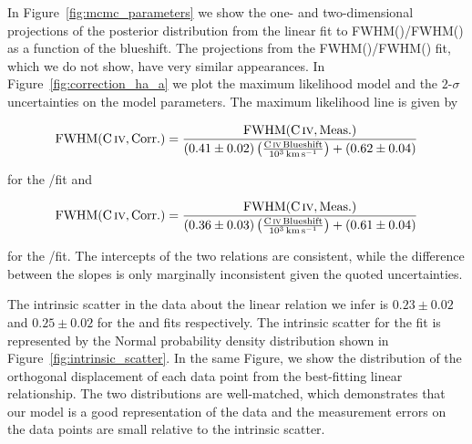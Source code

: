 In Figure~\ref{fig:mcmc_parameters} we show the one- and two-dimensional projections of the posterior distribution from the linear fit to FWHM()/FWHM(\hans) as a function of the  blueshift. 
The projections from the FWHM()/FWHM(\hbns) fit, which we do not show, have very similar appearances.
In Figure~\ref{fig:correction_ha_a} we plot the maximum likelihood model and the $2$-$\sigma$ uncertainties on the model parameters. 
The maximum likelihood line is given by  

\begingroup\makeatletter{}\check@mathfonts
\begin{eqnarray}
    \label{eq:hafwhm}
    \text{FWHM}(\text{C}\,\textsc{iv}, \text{Corr.}) = \frac{\text{FWHM}(\text{C}\,\textsc{iv}, \text{Meas.})}{ (0.41\pm0.02) \left(\frac{\text{C}\,\textsc{iv}\, \text{Blueshift}}{10^3 \,\text{km}\,\text{s}^{-1}} \right) + (0.62\pm0.04)}
\end{eqnarray}
\endgroup

\noindent for the /\ha fit and 

\begingroup\makeatletter{}\check@mathfonts
\begin{eqnarray}
    \label{eq:hbfwhm}
    \text{FWHM}(\text{C}\,\textsc{iv}, \text{Corr.}) = \frac{\text{FWHM}(\text{C}\,\textsc{iv}, \text{Meas.})}{ (0.36\pm0.03) \left(\frac{\text{C}\,\textsc{iv}\, \text{Blueshift}}{10^3 \,\text{km}\,\text{s}^{-1}} \right) + (0.61\pm0.04)}
\end{eqnarray}
\endgroup

\noindent for the /\hb fit. 
The intercepts of the two relations are consistent, while the difference between the slopes is only marginally inconsistent given the quoted uncertainties. 

The intrinsic scatter in the data about the linear relation we infer is $0.23 \pm 0.02$ and $0.25 \pm 0.02$ for the \ha and \hb fits respectively. 
The intrinsic scatter for the \ha fit is represented by the Normal probability density distribution shown in Figure~\ref{fig:intrinsic_scatter}. 
In the same Figure, we show the distribution of the orthogonal displacement of each data point from the best-fitting linear relationship. 
The two distributions are well-matched, which demonstrates that our model is a good representation of the data and the measurement errors on the data points are small relative to the intrinsic scatter.    

